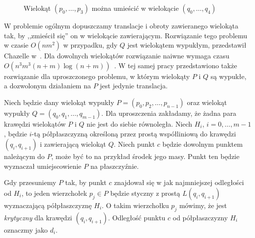 \begin{figure}[htb]
  \caption{Wielokąt $(p_0, \ldots, p_3)$ można umieścić w wielokącie
    $(q_0, \ldots, q_4)$\label{img:containment1}}
\end{figure}

W problemie ogólnym dopuszczamy translacje i obroty zawieranego
wielokąta tak, by ,,zmieścił się'' on w wielokącie
zawierającym. Rozwiązanie tego problemu w czasie $O(nm^2)$ w
przypadku, gdy $Q$ jest wielokątem wypukłym, przedstawił Chazelle
w~\cite{Chazelle83}. Dla dowolnych wielokątów rozwiązanie naiwne
wymaga czasu $O(n^3m^3(n + m) \log{(n + m)})$~\cite{Chazelle83}. W tej
samej pracy przedstawiono także rozwiązanie dla uproszczonego
problemu, w którym wielokąty $P$ i $Q$ są wypukłe, a dozwolonym
działaniem na $P$ jest jedynie translacja.

Niech będzie dany wielokąt wypukły $P = (p_0, p_2, \ldots, p_{n-1})$
oraz wielokąt wypukły $Q = (q_0, q_1, \ldots, q_{m-1})$. Dla
uproszczenia zakładamy, że żadna para krawędzi wielokątów $P$ i $Q$
nie jest do siebie równoległa. Niech $H_i$, $i = 0, \ldots, m - 1$,
będzie $i$-tą półpłaszczyzną określoną przez prostą współliniową do
krawędzi $(q_i, q_{i+1})$ i zawierającą wielokąt $Q$. Niech punkt $c$
będzie dowolnym punktem należącym do $P$, może być to na przykład
środek jego masy. Punkt ten będzie wyznaczał umiejscowienie $P$ na
płaszczyźnie.

Gdy przesuniemy $P$ tak, by punkt $c$ znajdował się w jak najmniejszej
odległości od $H_i$, to jeden wierzchołek $p_j \in P$ będzie styczny z
prostą $L(q_i, q_{i+1})$ wyznaczającą półpłaszczyznę $H_i$. O takim
wierzchołku $p_j$ mówimy, że jest \emph{krytyczny} dla krawędzi $(q_i,
q_{i+1})$. Odległość punktu $c$ od półpłaszczyzny $H_i$ oznaczmy jako
$d_i$.

